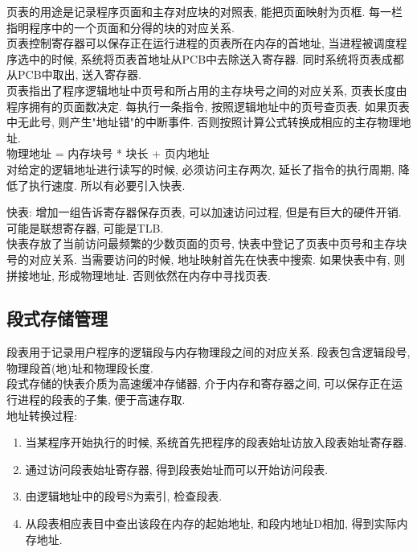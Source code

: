 \documentclass[a4paper, 12pt, notitlepage]{article}
\begin{document}
	页表的用途是记录程序页面和主存对应块的对照表, 能把页面映射为页框. 每一栏指明程序中的一个页面和分得的块的对应关系. \\
	
	页表控制寄存器可以保存正在运行进程的页表所在内存的首地址, 当进程被调度程序选中的时候, 系统将页表首地址从PCB中去除送入寄存器. 同时系统将页表成都从PCB中取出, 送入寄存器. \\
	
	页表指出了程序逻辑地址中页号和所占用的主存块号之间的对应关系, 页表长度由程序拥有的页面数决定. 每执行一条指令, 按照逻辑地址中的页号查页表. 如果页表中无此号, 则产生"地址错"的中断事件. 否则按照计算公式转换成相应的主存物理地址. \\
	
	物理地址 = 内存块号 * 块长 + 页内地址 \\
	
	对给定的逻辑地址进行读写的时候, 必须访问主存两次, 延长了指令的执行周期, 降低了执行速度. 所以有必要引入快表. 
	
	快表: 增加一组告诉寄存器保存页表, 可以加速访问过程, 但是有巨大的硬件开销. 可能是联想寄存器, 可能是TLB. \\

	快表存放了当前访问最频繁的少数页面的页号, 快表中登记了页表中页号和主存块号的对应关系. 当需要访问的时候, 地址映射首先在快表中搜索. 如果快表中有, 则拼接地址, 形成物理地址. 否则依然在内存中寻找页表. 
	
\subsection{段式存储管理}

	段表用于记录用户程序的逻辑段与内存物理段之间的对应关系. 段表包含逻辑段号, 物理段首(地)址和物理段长度. \\
	
	段式存储的快表介质为高速缓冲存储器, 介于内存和寄存器之间, 可以保存正在运行进程的段表的子集, 便于高速存取. \\
	
	地址转换过程: 
	
\begin{enumerate}
	\item 当某程序开始执行的时候, 系统首先把程序的段表始址访放入段表始址寄存器. 
	\item 通过访问段表始址寄存器, 得到段表始址而可以开始访问段表. 
	\item 由逻辑地址中的段号S为索引, 检查段表. 
	\item 从段表相应表目中查出该段在内存的起始地址, 和段内地址D相加, 得到实际内存地址. 
\end{enumerate}	
	
\end{document}

